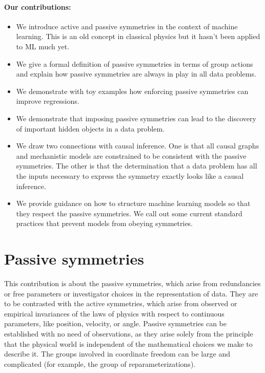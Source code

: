 \documentclass{article}
\theoremstyle{plain}
\theoremstyle{definition}
\theoremstyle{remark}
\begin{document}
\paragraph{Our contributions:}
\begin{itemize}
\item
We introduce active and passive symmetries in the context of machine learning. This is an old concept in classical physics but it hasn't been applied to ML much yet.
\item
We give a formal definition of passive symmetries in terms of group actions and explain how passive symmetries are always in play in all data problems.
\item
We demonstrate with toy examples how enforcing passive symmetries can improve regressions. 
\item
We demonstrate that imposing passive symmetries can lead to the discovery of important hidden objects in a data problem.
\item
We draw two connections with causal inference. One is that all causal graphs and mechanistic models are constrained to be consistent with the passive symmetries. The other is that the determination that a data problem has all the inputs necessary to express the symmetry exactly looks like a causal inference.
\item 
We provide guidance on how to structure machine learning models so that they respect the passive symmetries. We call out some current standard practices that prevent models from obeying symmetries. 
\end{itemize}

\section{Passive symmetries}\label{sec:informal}

This contribution is about the passive symmetries, which arise from redundancies or free parameters or investigator choices in the representation of data.
They are to be contrasted with the active symmetries, which arise from observed or empirical invariances of the laws of physics with respect to continuous parameters, like position, velocity, or angle.
Passive symmetries can be established with no need of observations, as they arise solely from the principle that the physical world is independent of the mathematical choices we make to describe it.
The groups involved in coordinate freedom can be large and complicated (for example, the group of reparameterizations).
\end{document}
